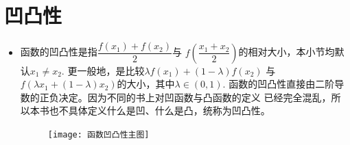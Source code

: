 \section{凹凸性}
\begin{itemize}[leftmargin=\inteval{\myitemleftmargin}pt,itemsep=
   \inteval{\myitemitempsep}pt,topsep=\inteval{\myitemtopsep}pt]

\item 函数的凹凸性是指$ \dfrac{f(x_1)+f(x_2)}{2} $与
$ f(\dfrac{x_1+x_2}{2}) $的相对大小，本小节均默认$ x_1 \neq x_2 $. 
更一般地，是比较$ \lambda f(x_1)+(1-\lambda)f(x_2) $ 
与$ f(\lambda x_1+(1-\lambda)x_2) $的大小，其中$ \lambda \in (0,1) $. 
函数的凹凸性直接由二阶导数的正负决定。因为不同的书上对凹函数与凸函数的定义
已经完全混乱，所以本书也不具体定义什么是凹、什么是凸，统称为凹凸性。
\begin{figure}[H]
    \centering
    \texttt{[image: 函数凹凸性主图]}
\end{figure}


\end{itemize}
